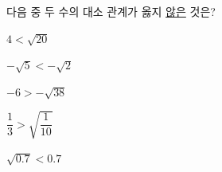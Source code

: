 다음 중 두 수의 대소 관계가 옳지 \underline{않은} 것은?
\begin{choices32}{\rule[-3ex]{0pt}{8ex}$4<\sqrt{20}$}{\rule[-3ex]{0pt}{8ex}$-\sqrt{5}<-\sqrt{2}$}{\rule[-3ex]{0pt}{8ex}$-6>-\sqrt{38}$}{\rule[-3ex]{0pt}{8ex}$\dfrac{1}{3}>\sqrt{\dfrac{1}{10}}$}{\rule[-3ex]{0pt}{8ex}$\sqrt{0.7}<0.7$}\end{choices32}

